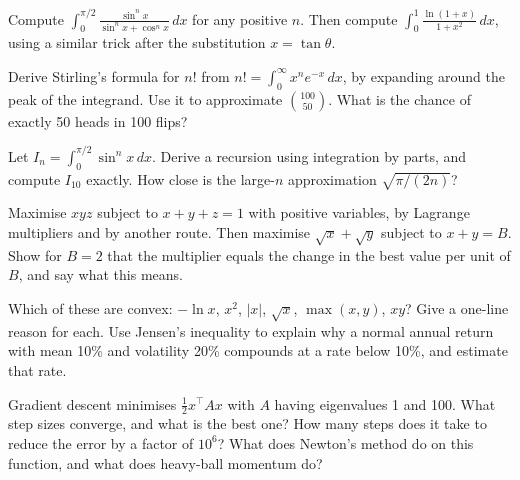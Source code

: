 \begin{question}\label{iq:iv1:calculus-and-optimisation:5}
Compute $\int_0^{\pi/2} \frac{\sin^n x}{\sin^n x + \cos^n x}\,dx$ for any positive $n$. Then compute $\int_0^1 \frac{\ln(1 + x)}{1 + x^2}\,dx$, using a similar trick after the substitution $x = \tan\theta$.
\end{question}

\begin{question}\label{iq:iv1:calculus-and-optimisation:6}
Derive Stirling's formula for $n!$ from $n! = \int_0^\infty x^n e^{-x}\,dx$, by expanding around the peak of the integrand. Use it to approximate $\binom{100}{50}$. What is the chance of exactly 50 heads in 100 flips?
\end{question}

\begin{question}\label{iq:iv1:calculus-and-optimisation:7}
Let $I_n = \int_0^{\pi/2} \sin^n x\,dx$. Derive a recursion using integration by parts, and compute $I_{10}$ exactly. How close is the large-$n$ approximation $\sqrt{\pi/(2n)}$?
\end{question}

\begin{question}\label{iq:iv1:calculus-and-optimisation:8}
Maximise $xyz$ subject to $x + y + z = 1$ with positive variables, by Lagrange multipliers and by another route. Then maximise $\sqrt{x} + \sqrt{y}$ subject to $x + y = B$. Show for $B = 2$ that the multiplier equals the change in the best value per unit of $B$, and say what this means.
\end{question}

\begin{question}\label{iq:iv1:calculus-and-optimisation:9}
Which of these are convex: $-\ln x$, $x^2$, $|x|$, $\sqrt{x}$, $\max(x, y)$, $xy$? Give a one-line reason for each. Use Jensen's inequality to explain why a normal annual return with mean 10\% and volatility 20\% compounds at a rate below 10\%, and estimate that rate.
\end{question}

\begin{question}\label{iq:iv1:calculus-and-optimisation:10}
Gradient descent minimises $\frac12 x^\top Ax$ with $A$ having eigenvalues 1 and 100. What step sizes converge, and what is the best one? How many steps does it take to reduce the error by a factor of $10^6$? What does Newton's method do on this function, and what does heavy-ball momentum do?
\end{question}

